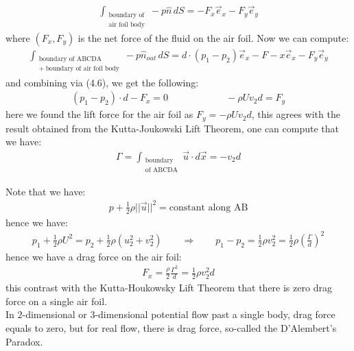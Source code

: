 \documentclass[11pt]{book}
\theoremstyle{break}
\theoremstyle{break}
\begin{document}
\begin{align*}
\int_{\substack{\text{boundary of}\\ \text{air foil body}}} -p \hat{n}\, dS = -F_x \vec{e}_x - F_y \vec{e}_y
\end{align*}
where $(F_x,F_y)$ is the net force of the fluid on the air foil. Now we can compute:
\begin{align*}
 \int_{\substack{\text{boundary of  ABCDA }\\ +\ \text{boundary of air foil body}}} -p \hat{n}_{out}\, dS = d\cdot (p_1 - p_2)\vec{e}_x  - F-x \vec{e}_x - F_y \vec{e}_y 
\end{align*}
and combining via (4.6), we get the following:
\begin{align*}
(p_1 - p_2) \cdot d - F_x = 0 \qquad\qquad\qquad -\rho Uv_2 d = F_y
\end{align*}
here we found the lift force for the air foil as $F_y = -\rho Uv_2 d$, this agrees with the result obtained from the Kutta-Joukowski Lift Theorem, one can compute that we have:
\begin{align*}
\Gamma = \int_{\substack{\text{boundary}\\\text{of ABCDA}}} \vec{u}\cdot d\vec{x} = -v_2 d
\end{align*}

Note that we have:
\begin{align*}
p+ \frac{1}{2}\rho ||\vec{u}||^2 = \text{constant along AB}
\end{align*}
hence we have:
\begin{align*}
p_1 + \frac{1}{2}\rho U^2 = p_2 + \frac{1}{2}\rho ( u_2^2 + v_2^2 ) \qquad \Rightarrow \qquad p_1 - p_2 = \frac{1}{2}\rho v_2^2 = \frac{1}{2}\rho \left( \frac{\Gamma}{d}\right)^2
\end{align*}
hence we have a drag force on the air foil:
\begin{align*}
F_x = \frac{\rho}{2} \frac{\Gamma^2}{d} = \frac{1}{2}\rho v_2^2 d
\end{align*}
this contrast with the Kutta-Houkowsky Lift Theorem that there is zero drag force on a single air foil.\\


In $2$-dimensional or $3$-dimensional potential flow past a single body, drag force equals to zero, but for real flow, there is drag force, so-called the D'Alembert's Paradox.\\
\end{document}
